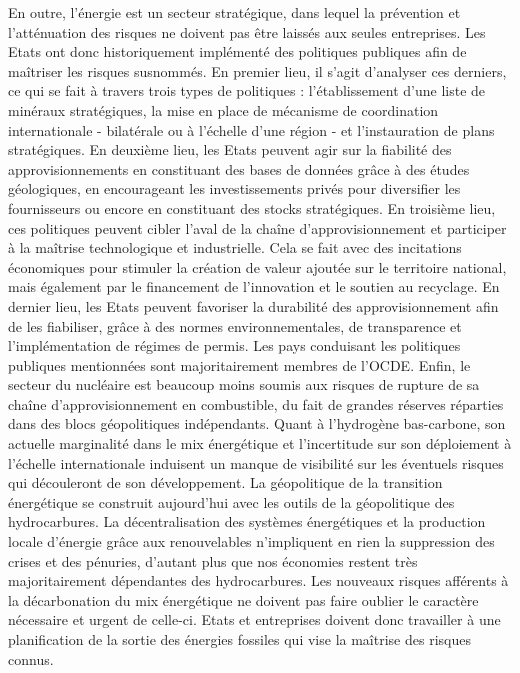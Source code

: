 \smallbreak
En outre, l'énergie est un secteur stratégique, dans lequel la prévention et l'atténuation des risques ne doivent pas être laissés aux seules entreprises. Les Etats ont donc historiquement implémenté des politiques publiques afin de maîtriser les risques susnommés. En premier lieu, il s'agit d'analyser ces derniers, ce qui se fait à travers trois types de politiques : l'établissement d'une liste de minéraux stratégiques, la mise en place de mécanisme de coordination internationale - bilatérale ou à l'échelle d'une région - et l'instauration de plans stratégiques. En deuxième lieu, les Etats peuvent agir sur la fiabilité des approvisionnements en constituant des bases de données grâce à des études géologiques, en encourageant les investissements privés pour diversifier les fournisseurs ou encore en constituant des stocks stratégiques. En troisième lieu, ces politiques peuvent cibler l'aval de la chaîne d'approvisionnement et participer à la maîtrise technologique et industrielle. Cela se fait avec des incitations économiques pour stimuler la création de valeur ajoutée sur le territoire national, mais également par le financement de l'innovation et le soutien au recyclage. En dernier lieu, les Etats peuvent favoriser la durabilité des approvisionnement afin de les fiabiliser, grâce à des normes environnementales, de transparence et l'implémentation de régimes de permis. Les pays conduisant les politiques publiques mentionnées sont majoritairement membres de l'OCDE.
\smallbreak
Enfin, le secteur du nucléaire est beaucoup moins soumis aux risques de rupture de sa chaîne d'approvisionnement en combustible, du fait de grandes réserves réparties dans des blocs géopolitiques indépendants. Quant à l'hydrogène bas-carbone, son actuelle marginalité dans le mix énergétique et l'incertitude sur son déploiement à l'échelle internationale induisent un manque de visibilité sur les éventuels risques qui découleront de son développement.
\smallbreak
La géopolitique de la transition énergétique se construit aujourd'hui avec les outils de la géopolitique des hydrocarbures. La décentralisation des systèmes énergétiques et la production locale d'énergie grâce aux renouvelables n'impliquent en rien la suppression des crises et des pénuries, d'autant plus que nos économies restent très majoritairement dépendantes des hydrocarbures. Les nouveaux risques afférents à la décarbonation du mix énergétique ne doivent pas faire oublier le caractère nécessaire et urgent de celle-ci. Etats et entreprises doivent donc travailler à une planification de la sortie des énergies fossiles qui vise la maîtrise des risques connus. 